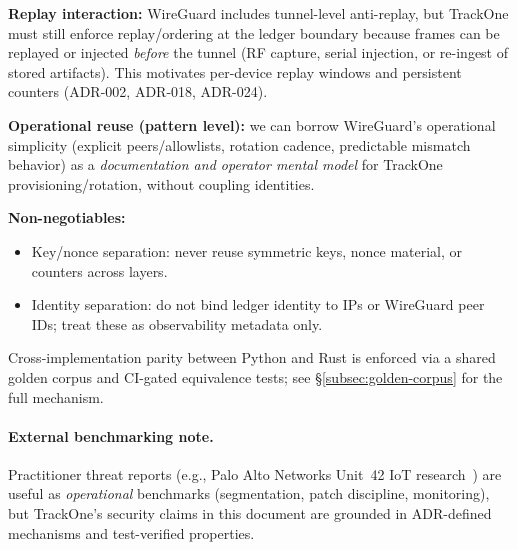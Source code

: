 \textbf{Replay interaction:}
WireGuard includes tunnel-level anti-replay, but TrackOne must still enforce replay/ordering at the ledger boundary because frames can be replayed or injected \emph{before} the tunnel (RF capture, serial injection, or re-ingest of stored artifacts).
This motivates per-device replay windows and persistent counters (\ac{ADR}-002, \ac{ADR}-018, \ac{ADR}-024). %

\textbf{Operational reuse (pattern level):}
we can borrow WireGuard's operational simplicity (explicit peers/allowlists, rotation cadence, predictable mismatch behavior) as a \emph{documentation and operator mental model} for TrackOne provisioning/rotation, without coupling identities.

\textbf{Non-negotiables:}
\begin{itemize}[nosep]
    \item Key/nonce separation: never reuse symmetric keys, nonce material, or counters across layers.
    \item Identity separation: do not bind ledger identity to IPs or WireGuard peer IDs; treat these as observability metadata only.
\end{itemize}

Cross-implementation parity between Python and Rust is enforced via a shared golden corpus
and \ac{CI}-gated equivalence tests; see \S\ref{subsec:golden-corpus} for the full mechanism.

\paragraph{External benchmarking note.}
Practitioner threat reports (e.g., Palo Alto Networks Unit~42 \ac{IoT} research~\cite{unit42_iot_benchmark_2024}) are useful as \emph{operational} benchmarks (segmentation, patch discipline, monitoring), but TrackOne's security claims in this document are grounded in \ac{ADR}-defined mechanisms and test-verified properties. %
